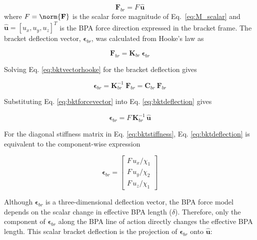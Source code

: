 \begin{equation}
\mathbf{F}_{br} = F \, \hat{\mathbf{u}}
\label{eq:bktforcevector}
\end{equation}
\noindent
where $F = \norm{\mathbf{F}}$ is the scalar force magnitude of Eq.~\eqref{eq:M_scalar} and $\hat{\mathbf{u}} = [u_{x}, u_{y}, u_{z}]^{T}$ is the BPA force direction expressed in the bracket frame. The bracket deflection vector, $\boldsymbol{\epsilon}_{br}$, was calculated from Hooke's law as 

\begin{equation} \mathbf{F}_{br} = \mathbf{K}_{br} \: \boldsymbol{\epsilon}_{br}
\label{eq:bktvectorhooke}
\end{equation}

Solving Eq. \ref{eq:bktvectorhooke} for the bracket deflection gives

\begin{equation}
\boldsymbol{\epsilon}_{br} = \mathbf{K}_{br}^{-1} \: \mathbf{F}_{br} = \mathbf{C}_{br} \: \mathbf{F}_{br}
\label{eq:bktdeflection}
\end{equation}

Substituting Eq. \ref{eq:bktforcevector} into Eq. \ref{eq:bktdeflection} gives

\begin{equation}
\boldsymbol{\epsilon}_{br} = F \,\mathbf{K}_{br}^{-1} \,\hat{\mathbf{u}}
\label{eq:bktdeflectionforceunit}
\end{equation}

For the diagonal stiffness matrix in Eq. \ref{eq:bktstiffness}, Eq. \ref{eq:bktdeflection} is equivalent to the component-wise expression

\begin{equation}
\boldsymbol{\epsilon}_{br} = \begin{bmatrix} F\,u_{x}/\chi_{1} \\ F\,u_{y}/\chi_{2} \\ F\,u_{z}/\chi_{1} \end{bmatrix}
\label{eq:bktcomponentdeflection}
\end{equation}

Although $\boldsymbol{\epsilon}_{br}$ is a three-dimensional deflection vector, the BPA force model depends on the scalar change in effective BPA length ($\delta$). Therefore, only the component of $\boldsymbol{\epsilon}_{br}$ along the BPA line of action directly changes the effective BPA length. This scalar bracket deflection is the projection of $\boldsymbol{\epsilon}_{br}$ onto $\hat{\mathbf{u}}$:

